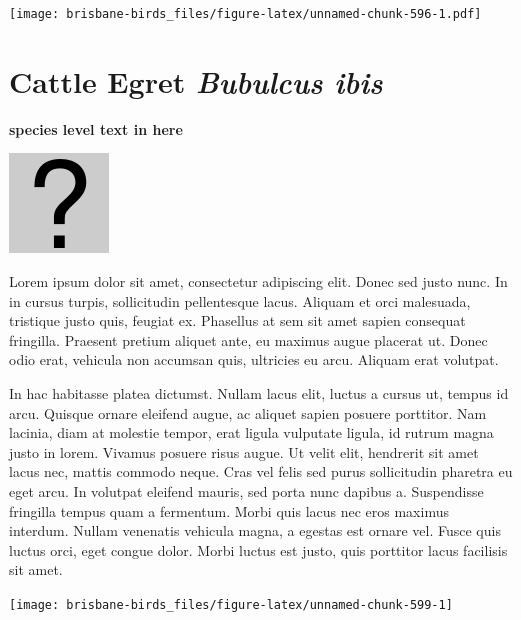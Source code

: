 \documentclass[]{book}
\let\origfigure\figure
\let\endorigfigure\endfigure
\renewenvironment{figure}[1][2] {
  \expandafter\origfigure\expandafter[H]
} {
  \endorigfigure
}
\begin{document}
\begin{figure}
\centering
\texttt{[image: brisbane-birds\_files/figure-latex/unnamed-chunk-596-1.pdf]}
\caption{\label{fig:unnamed-chunk-596}insert figure caption}
\end{figure}

\section{\texorpdfstring{Cattle Egret \emph{Bubulcus
ibis}}{Cattle Egret Bubulcus ibis}}\label{cattle-egret-bubulcus-ibis}

\textbf{species level text in here}

\begin{figure}
\centering
\includegraphics{assets/missing.png}
\caption{No image for species}
\end{figure}

Lorem ipsum dolor sit amet, consectetur adipiscing elit. Donec sed justo
nunc. In in cursus turpis, sollicitudin pellentesque lacus. Aliquam et
orci malesuada, tristique justo quis, feugiat ex. Phasellus at sem sit
amet sapien consequat fringilla. Praesent pretium aliquet ante, eu
maximus augue placerat ut. Donec odio erat, vehicula non accumsan quis,
ultricies eu arcu. Aliquam erat volutpat.

In hac habitasse platea dictumst. Nullam lacus elit, luctus a cursus ut,
tempus id arcu. Quisque ornare eleifend augue, ac aliquet sapien posuere
porttitor. Nam lacinia, diam at molestie tempor, erat ligula vulputate
ligula, id rutrum magna justo in lorem. Vivamus posuere risus augue. Ut
velit elit, hendrerit sit amet lacus nec, mattis commodo neque. Cras vel
felis sed purus sollicitudin pharetra eu eget arcu. In volutpat eleifend
mauris, sed porta nunc dapibus a. Suspendisse fringilla tempus quam a
fermentum. Morbi quis lacus nec eros maximus interdum. Nullam venenatis
vehicula magna, a egestas est ornare vel. Fusce quis luctus orci, eget
congue dolor. Morbi luctus est justo, quis porttitor lacus facilisis sit
amet.

\begin{figure}
\texttt{[image: brisbane-birds\_files/figure-latex/unnamed-chunk-599-1]} \caption{insert figure caption}\label{fig:unnamed-chunk-599}
\end{figure}
\end{document}
